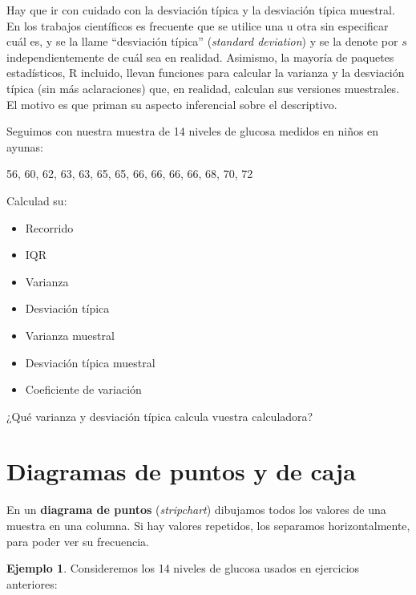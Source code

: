 \documentclass[
]{book}
\providecommand{\tightlist}{%
  \setlength{\itemsep}{0pt}\setlength{\parskip}{0pt}}
\theoremstyle{definition}
\theoremstyle{definition}
\newtheorem{example}{Ejemplo}[chapter]
\theoremstyle{definition}
\theoremstyle{definition}
\theoremstyle{remark}
\begin{document}
\begin{rmdcaution}
Hay que ir con cuidado con la desviación típica y la desviación típica muestral. En los trabajos científicos es frecuente que se utilice una u otra sin especificar cuál es, y se la llame ``desviación típica'' (\emph{standard deviation}) y se la denote por \(s\) independientemente de cuál sea en realidad. Asimismo, la mayoría de paquetes estadísticos, R incluido, llevan funciones para calcular la varianza y la desviación típica (sin más aclaraciones) que, en realidad, calculan sus versiones muestrales. El motivo es que priman su aspecto inferencial sobre el descriptivo.
\end{rmdcaution}

\begin{rmdexercici}
Seguimos con nuestra muestra de 14 niveles de glucosa medidos en niños en ayunas:

56, 60, 62, 63, 63, 65, 65, 66, 66, 66, 66, 68, 70, 72

Calculad su:

\begin{itemize}
\tightlist
\item
  Recorrido
\item
  IQR
\item
  Varianza
\item
  Desviación típica
\item
  Varianza muestral
\item
  Desviación típica muestral
\item
  Coeficiente de variación
\end{itemize}

¿Qué varianza y desviación típica calcula vuestra calculadora?
\end{rmdexercici}

\hypertarget{diagramas-de-puntos-y-de-caja}{%
\section{Diagramas de puntos y de caja}\label{diagramas-de-puntos-y-de-caja}}

En un \textbf{diagrama de puntos} (\emph{stripchart}) dibujamos todos los valores de una muestra en una columna. Si hay valores repetidos, los separamos horizontalmente, para poder ver su frecuencia.

\begin{example}
\protect\hypertarget{exm:glucosasch}{}\label{exm:glucosasch}Consideremos los 14 niveles de glucosa usados en ejercicios anteriores:
\end{example}
\end{document}
